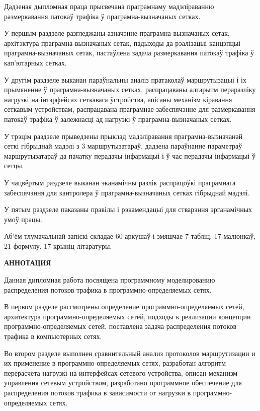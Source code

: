 \thispagestyle{empty}

Дадзеная дыпломная праца прысвечана праграмнаму мадэліраванню
размеркавання патокаў трафіка ў праграмна-вызначаных сетках.

У першым раздзеле разгледжаны азначэнне праграмна-вызначаных сетак,
архітэктура праграмна-вызначаных сетак, падыходы да рэалізацыі
канцэпцыі праграмна-вызначаных сетак, пастаўлена задача
размеркавання патокаў трафіка ў кап'ютарных сетках.

У другім раздзеле выканан параўнальны аналіз пратаколаў маршрутызацыі
і іх прымяненне ў праграмна-вызначаных сетках, распрацаваны алгарытм
пераразліку нагрузкі на інтэрфейсах сеткавага ўстройства,
апісаны механізм кіравання сеткавым устройствам, распрацавана
праграмнае забеспячэнне для размеркавання патокаў трафіка ў
залежнасці ад нагрузкі ў праграмна-вызначаных сетках.

У трэцім раздзеле прыведзены прыклад мадэліравання праграмна-вызначанай
сеткі гібрыднай мадэлі з 3 маршрутызатараў, дадзена параўнанне параметраў
маршрутызатараў да пачатку перадачы інфармацыі і ў час перадачы інфармацыі
ў сетцы.

У чацвёртым раздзеле выканан эканамічны разлік распрацоўкі праграмнага
забеспячэння для кантролера ў праграмна-вызначаных сетках гібрыднай мадэлі.

У пятым раздзеле паказаны правілы і рэкамендацыі для стварэння
эрганамічных умоў працы.

Аб'ём тлумачальнай запіскі складае 60 аркушаў і змяшчае
7 табліц, 17 малюнкаў, 21 формулу, 17 крыніц літаратуры.

\clearpage

\begin{center}
\fontsize{14}{14}
\selectfont
\textbf{АННОТАЦИЯ}
\end{center}
\thispagestyle{empty}

Данная дипломная работа посвящена программному моделированию
распределения потоков трафика в программно-определяемых сетях.

В первом разделе рассмотрены определение программно-определяемых
сетей, архитектура программно-определяемых сетей, подходы к реализации
концепции программно-оп\-ре\-де\-ля\-емых сетей, поставлена задача распределения
потоков трафика в компьютерных сетях.

Во втором разделе выполнен сравнительный анализ протоколов маршрутизации
и их применение в программно-определяемых сетях, разработан алгоритм
перерасчёта нагрузкі на интерфейсах сетевого устройства, описан механизм
управления сетевым устройством, разработано программное обеспечение для
распределения потоков трафика в зависимости от нагрузки в программно-определяемых сетях.

